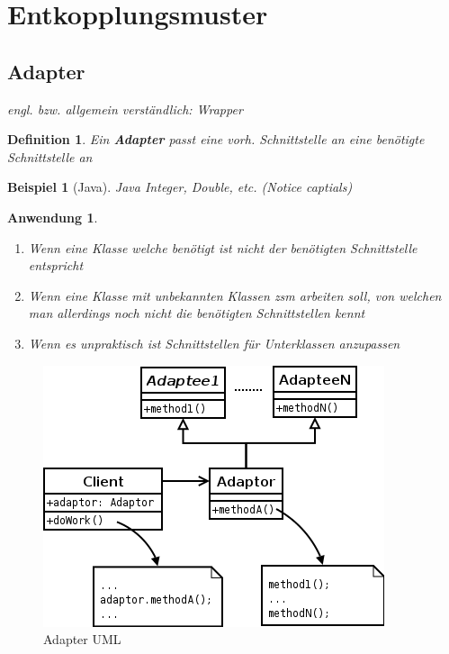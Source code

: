 \documentclass[a4paper]{article}
\theoremstyle{break}
\newtheorem{defi}{Definition}[section]
\newtheorem{ex}{Beispiel}[section]
\newtheorem{why}{Anwendung}[section]
\begin{document}
\newpage


\section{Entkopplungsmuster}
\subsection{Adapter}
\textit{engl. bzw. allgemein verständlich: Wrapper}
\begin{defi}
	Ein \textbf{Adapter} passt eine vorh. Schnittstelle an eine benötigte Schnittstelle an
\end{defi}
\begin{ex}[Java]
	Java Integer, Double, etc. (Notice captials)
\end{ex}
\begin{why}
	\begin{enumerate}
		\item Wenn eine Klasse welche benötigt ist nicht der benötigten Schnittstelle entspricht
		\item Wenn eine Klasse mit unbekannten Klassen zsm arbeiten soll, von welchen man allerdings noch nicht die benötigten Schnittstellen kennt
		\item Wenn es unpraktisch ist Schnittstellen für Unterklassen anzupassen
	\end{enumerate}
\end{why}
\begin{figure}[H]
	\centering
	\includegraphics[width=\textwidth]{../diagrams/uml/AdapterPattern.png}
	\caption{Adapter UML}
\end{figure}
\end{document}
